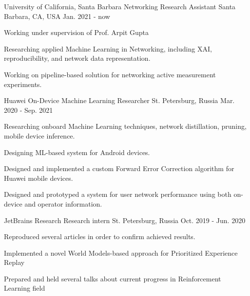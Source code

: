 

\begin{cventries}

\cventry
	{University of California, Santa Barbara} %
	{Networking Research Assistant} %
	{Santa Barbara, CA, USA} %
	{Jan. 2021 - now} %
	{
		\begin{cvitems} %
			\item {Working under supervision of Prof. Arpit Gupta}
			\item {Researching applied Machine Learning in Networking, including XAI, reproducibility, and network data representation.}
			\item {Working on pipeline-based solution for networking active measurement experiments.}
		\end{cvitems}
	}
	
\cventry
	{Huawei} %
	{On-Device Machine Learning Researcher} %
	{St. Petersburg, Russia} %
	{Mar. 2020 - Sep. 2021} %
	{
		\begin{cvitems} %
			\item {Researching onboard Machine Learning techniques, network distillation, pruning, mobile device inference.}
			\item {Designing ML-based system for Android devices.}
			\item {Designed and implemented a custom Forward Error Correction algorithm for Huawei mobile devices.}
			\item {Designed and prototyped a system for user network performance using both on-device and operator information.}
		\end{cvitems}
	}
	
  \cventry
	{JetBrains Research} %
	{Research intern} %
	{St. Petersburg, Russia} %
	{Oct. 2019 - Jun. 2020} %
	{
		\begin{cvitems} %
			\item {Reproduced several articles in order to confirm achieved results.}
			\item {Implemented a novel World Models-based approach for Prioritized Experience Replay}
			\item {Prepared and held several talks about current progress in Reinforcement Learning field}
		\end{cvitems}
}


\end{cventries}
